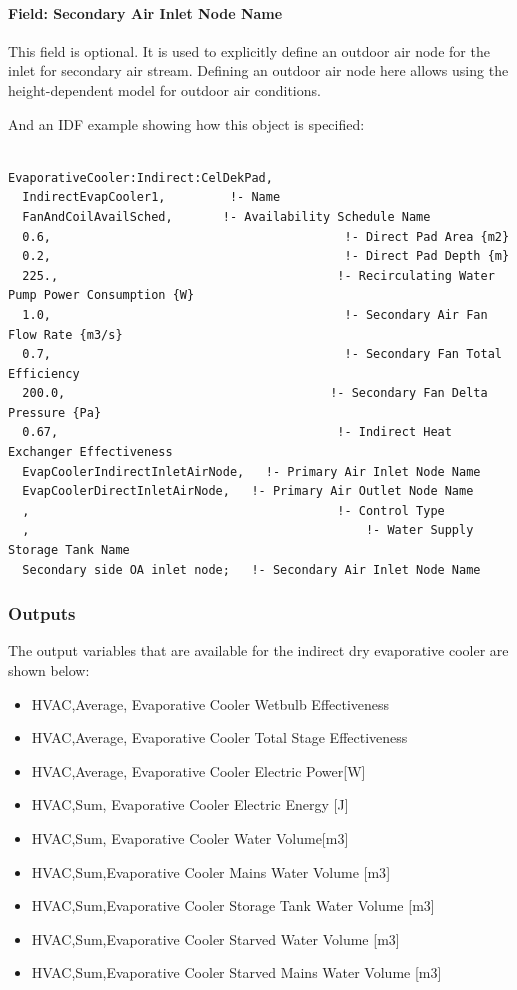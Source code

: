 \paragraph{Field: Secondary Air Inlet Node Name}\label{field-secondary-air-inlet-node-name-000}

This field is optional. It is used to explicitly define an outdoor air node for the inlet for secondary air stream. Defining an outdoor air node here allows using the height-dependent model for outdoor air conditions.

And an IDF example showing how this object is specified:

\begin{lstlisting}

EvaporativeCooler:Indirect:CelDekPad,
  IndirectEvapCooler1,         !- Name
  FanAndCoilAvailSched,       !- Availability Schedule Name
  0.6,                                         !- Direct Pad Area {m2}
  0.2,                                         !- Direct Pad Depth {m}
  225.,                                       !- Recirculating Water Pump Power Consumption {W}
  1.0,                                         !- Secondary Air Fan Flow Rate {m3/s}
  0.7,                                         !- Secondary Fan Total Efficiency
  200.0,                                     !- Secondary Fan Delta Pressure {Pa}
  0.67,                                       !- Indirect Heat Exchanger Effectiveness
  EvapCoolerIndirectInletAirNode,   !- Primary Air Inlet Node Name
  EvapCoolerDirectInletAirNode,   !- Primary Air Outlet Node Name
  ,                                           !- Control Type
  ,                                               !- Water Supply Storage Tank Name
  Secondary side OA inlet node;   !- Secondary Air Inlet Node Name
\end{lstlisting}

\subsubsection{Outputs}\label{outputs-2-008}

The output variables that are available for the indirect dry evaporative cooler are shown below:

\begin{itemize}
\item
  HVAC,Average, Evaporative Cooler Wetbulb Effectiveness
\item
  HVAC,Average, Evaporative Cooler Total Stage Effectiveness
\item
  HVAC,Average, Evaporative Cooler Electric Power{[}W{]}
\item
  HVAC,Sum, Evaporative Cooler Electric Energy {[}J{]}
\item
  HVAC,Sum, Evaporative Cooler Water Volume{[}m3{]}
\item
  HVAC,Sum,Evaporative Cooler Mains Water Volume {[}m3{]}
\item
  HVAC,Sum,Evaporative Cooler Storage Tank Water Volume {[}m3{]}
\item
  HVAC,Sum,Evaporative Cooler Starved Water Volume {[}m3{]}
\item
  HVAC,Sum,Evaporative Cooler Starved Mains Water Volume {[}m3{]}
\end{itemize}

